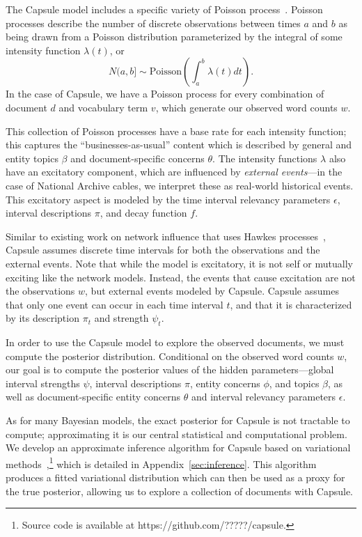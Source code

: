   The Capsule model includes a specific variety of Poisson process~\cite{Kingman:1993}.
Poisson processes describe the number of discrete observations between times $a$ and $b$ as being drawn from a Poisson distribution parameterized by the integral of some intensity function $\lambda(t)$, or
\[ N(a,b] \sim \mbox{Poisson}\left(\int_a^b \lambda(t) dt\right). \]
In the case of Capsule, we have a Poisson process for every combination of document $d$ and vocabulary term $v$, which generate our observed word counts $w$.

This collection of Poisson processes have a base rate for each intensity function; this captures the ``businesses-as-usual'' content which is described by general and entity topics $\beta$ and document-specific concerns $\theta$.  The intensity functions $\lambda$ also have an excitatory component, which are influenced by \emph{external events}---in the case of National Archive cables, we interpret these as real-world historical events. This excitatory aspect is modeled by the time interval relevancy parameters $\epsilon$, interval descriptions $\pi$, and decay function $f$.

Similar to existing work on network influence that uses Hawkes processes~\cite{linderman2015scalable,guo2014bayesian}, Capsule assumes discrete time intervals for both the observations and the external events.
Note that while the model is excitatory, it is not self or mutually exciting like the network models.  Instead, the events that cause excitation are not the observations $w$, but external events modeled by Capsule.  Capsule assumes that only one event can occur in each time interval $t$, and that it is characterized by its description $\pi_t$ and strength $\psi_t$. 

In order to use the Capsule model to explore the observed documents, we must compute the posterior distribution.  Conditional on the observed word counts $w$, our goal is to compute the posterior values of the hidden parameters---global interval strengths $\psi$, interval descriptions $\pi$, entity concerns $\phi$, and topics $\beta$, as well as document-specific entity concerns $\theta$ and interval relevancy parameters $\epsilon$.

As for many Bayesian models, the exact posterior for Capsule is not tractable to compute; approximating it is our central statistical and computational problem.  We develop an approximate inference algorithm for Capsule based on variational methods~\cite{Wainwright:2008},\footnote{Source code is available at https://github.com/?????/capsule.} which is detailed in Appendix~\ref{sec:inference}. This algorithm produces a fitted variational distribution which can then be used as a proxy for the true posterior, allowing us to explore a collection of documents with Capsule.  


